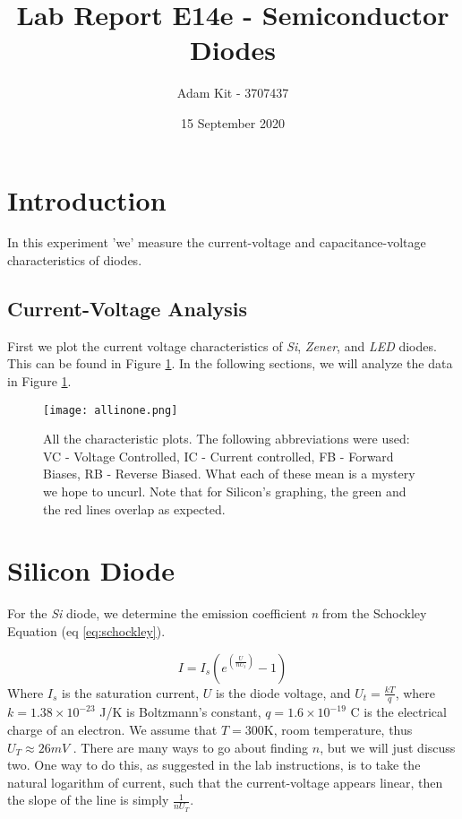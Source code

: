 \documentclass{article}
\title{Lab Report E14e - Semiconductor Diodes}
\author{Adam Kit - 3707437}
\date{15 September 2020}
\begin{document}
\maketitle
\section*{Introduction}

In this experiment 'we' measure the current-voltage and capacitance-voltage characteristics of diodes.

\subsection*{Current-Voltage Analysis}\label{subsec:current-voltage-analysis}
First we plot the current voltage characteristics of \textit{Si}, \textit{Zener}, and \textit{LED} diodes.
This can be found in Figure \ref{fig:allinone}.
In the following sections, we will analyze the data in Figure \ref{fig:allinone}.
\begin{figure}
    \centering
    \texttt{[image: allinone.png]}
    \caption{All the characteristic plots. The following abbreviations were used: VC - Voltage Controlled, IC - Current controlled, FB - Forward Biases, RB - Reverse Biased. What each of these mean is a mystery we hope to uncurl. Note that for Silicon's graphing, the green and the red lines overlap as expected.}
    \label{fig:allinone}
\end{figure}
\section{Silicon Diode}\label{sec:silicon-diode}
For the \textit{Si} diode, we determine the emission coefficient \textit{n} from the Schockley Equation (eq \ref{eq:schockley}).

\begin{equation}
    I = I_s \left( e^{\left( \frac{U}{nU_t}\right)} - 1 \right)
    \label{eq:schockley}
\end{equation}
Where $I_s$ is the saturation current, $U$ is the diode voltage, and $U_t = \frac{kT}{q}$, where $k=1.38 \times 10^{-23}$ J/K is Boltzmann's constant,  $q=1.6\times 10^{-19}$ C is the electrical charge of an electron.
We assume that $T = 300$K, room temperature, thus $U_T \approx 26 mV$ \cite{semiconducter}.
There are many ways to go about finding $n$, but we will just discuss two.
One way to do this, as suggested in the lab instructions, is to take the natural logarithm of current, such that the current-voltage appears linear, then the slope of the line is simply $\frac{1}{nU_T}$.
\end{document}
